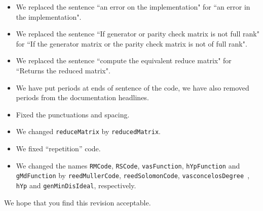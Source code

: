 \documentclass[12pt]{amsart}
\theoremstyle{plain}
\begin{document}
\begin{itemize}
\item We replaced the sentence ``an error on the implementation" for ``an error in the implementation".
\item We replaced the sentence ``If generator or parity check matrix is not full rank" for ``If the generator matrix or the parity check matrix is not of full rank".
\item We replaced the sentence ``compute the equivalent reduce matrix" for ``Returns the reduced matrix".
\item We have put periods at ends of sentence of the code, we have also removed periods from the documentation headlines.
\item Fixed the punctuations and spacing.
\item We changed {\tt reduceMatrix} by {\tt reducedMatrix}.
\item We fixed ``repetition'' code.
\item We changed the names {\tt RMCode}, {\tt RSCode}, {\tt vasFunction}, {\tt hYpFunction} and {\tt gMdFunction} by {\tt reedMullerCode}, {\tt reedSolomonCode}, {\tt vasconcelosDegree }, {\tt hYp} and {\tt genMinDisIdeal}, respectively.
\end{itemize}



We hope that you find this revision acceptable. 
\end{document}
